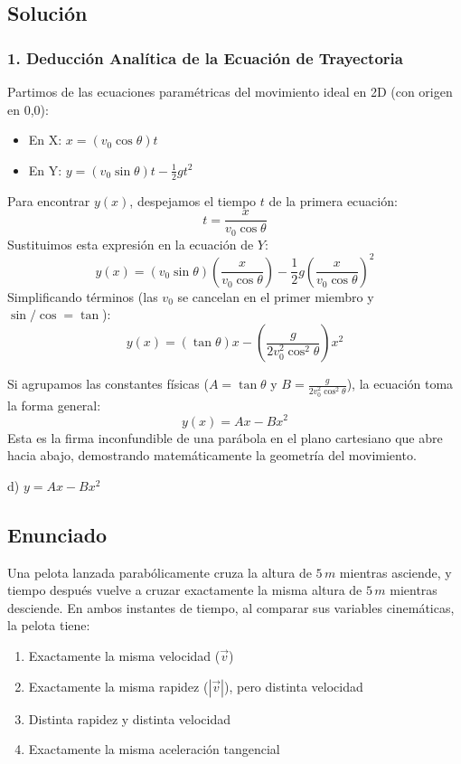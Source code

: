 \documentclass[12pt, a4paper]{article}
\begin{document}
\subsection*{Solución}

\subsubsection*{1. Deducción Analítica de la Ecuación de Trayectoria}
Partimos de las ecuaciones paramétricas del movimiento ideal en 2D (con origen en 0,0):
\begin{itemize}
    \item En X: $x = (v_0 \cos\theta) t$
    \item En Y: $y = (v_0 \sin\theta) t - \frac{1}{2}g t^2$
\end{itemize}
Para encontrar $y(x)$, despejamos el tiempo $t$ de la primera ecuación:
$$ t = \frac{x}{v_0 \cos\theta} $$
Sustituimos esta expresión en la ecuación de $Y$:
$$ y(x) = (v_0 \sin\theta) \left( \frac{x}{v_0 \cos\theta} \right) - \frac{1}{2}g \left( \frac{x}{v_0 \cos\theta} \right)^2 $$
Simplificando términos (las $v_0$ se cancelan en el primer miembro y $\sin/\cos = \tan$):
$$ y(x) = (\tan\theta) x - \left( \frac{g}{2 v_0^2 \cos^2\theta} \right) x^2 $$

Si agrupamos las constantes físicas ($A = \tan\theta$ y $B = \frac{g}{2 v_0^2 \cos^2\theta}$), la ecuación toma la forma general:
$$ y(x) = Ax - Bx^2 $$
Esta es la firma inconfundible de una parábola en el plano cartesiano que abre hacia abajo, demostrando matemáticamente la geometría del movimiento.

\begin{tcolorbox}[colback=green!5!white, colframe=green!50!black, title=Respuesta Final]
\centering \Large d) $y = Ax - Bx^2$
\end{tcolorbox}

\newpage

\subsection*{Enunciado}
Una pelota lanzada parabólicamente cruza la altura de $5\,\si{m}$ mientras asciende, y tiempo después vuelve a cruzar exactamente la misma altura de $5\,\si{m}$ mientras desciende. En ambos instantes de tiempo, al comparar sus variables cinemáticas, la pelota tiene:
\begin{enumerate}[label=\alph*)]
    \item Exactamente la misma velocidad ($\vec{v}$)
    \item Exactamente la misma rapidez ($|\vec{v}|$), pero distinta velocidad
    \item Distinta rapidez y distinta velocidad
    \item Exactamente la misma aceleración tangencial
\end{enumerate}
\end{document}
